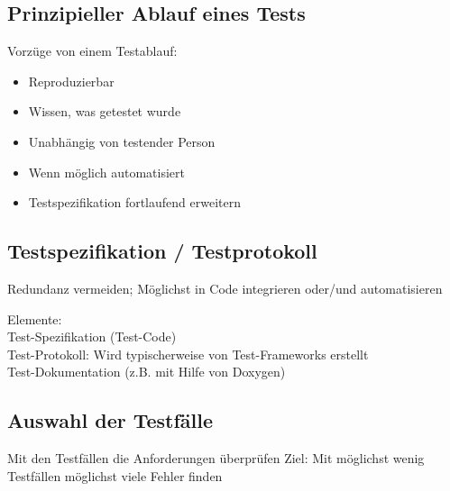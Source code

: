 \subsection{Prinzipieller Ablauf eines Tests}
\begin{multicols}{2}
\columnbreak

Vorzüge von einem Testablauf: 
\begin{itemize}
	\item  Reproduzierbar
	 \item Wissen, was getestet wurde
	\item Unabhängig von testender Person
	\item Wenn möglich automatisiert
	\item Testspezifikation fortlaufend erweitern
\end{itemize}
\end{multicols}
\subsection{Testspezifikation / Testprotokoll}
Redundanz vermeiden; Möglichst in Code integrieren oder/und 
automatisieren

Elemente: \\
Test-Spezifikation (Test-Code) \\
Test-Protokoll: Wird typischerweise von Test-Frameworks 
erstellt \\
Test-Dokumentation (z.B. mit Hilfe von Doxygen)

\subsection{Auswahl der Testfälle}
Mit den Testfällen die Anforderungen überprüfen
Ziel: Mit möglichst wenig Testfällen möglichst viele Fehler finden

